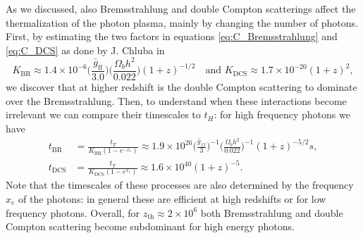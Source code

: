 As we discussed, also Bremsstrahlung and double Compton scatterings affect the thermalization of the photon plasma, mainly by changing the number of photons. First, by estimating the two factors in equations \eqref{eq:C_Bremsstrahlung} and \eqref{eq:C_DCS} as done by J. Chluba in \cite{chlubafuturestepscosmologyusing}
$$K_\text{BR}\approx1.4\times10^{-6}\bigg(\frac{\bar{g}_\text{ff}}{3.0}\bigg)\bigg(\frac{\Omega_b h^2}{0.022}\bigg)(1+z)^{-1/2}\quad\text{and }K_\text{DCS}\approx1.7\times10^{-20}(1+z)^2,$$ we discover that at higher redshift is the double Compton scattering to dominate over the Bremsstrahlung. Then, to understand when these interactions become irrelevant we can compare their timescales to $t_H$: for high frequency photons we have
\begin{align*}
    t_{\text{BR}}&=\frac{t_T}{K_\text{BR}(1-e^{-x_e})}\approx1.9\times10^{26}\bigg(\frac{\bar{g}_{ff}}{3}\bigg)^{-1}\bigg(\frac{\Omega_bh^2}{0.022}\bigg)^{-1}(1+z)^{-5/2}s,\\
    t_{\text{DCS}}&=\frac{t_T}{K_\text{DCS}(1-e^{x_e})}\approx1.6\times10^{40}(1+z)^{-5}.
\end{align*}
Note that the timescales of these processes are also determined by the frequency $x_e$ of the photons: in general these are efficient at high redshifts or for low frequency photons. Overall, for $z_{\text{th}}\approx2\times10^6$ both Bremsstrahlung and double Compton scattering become subdominant for high energy photons.\\
